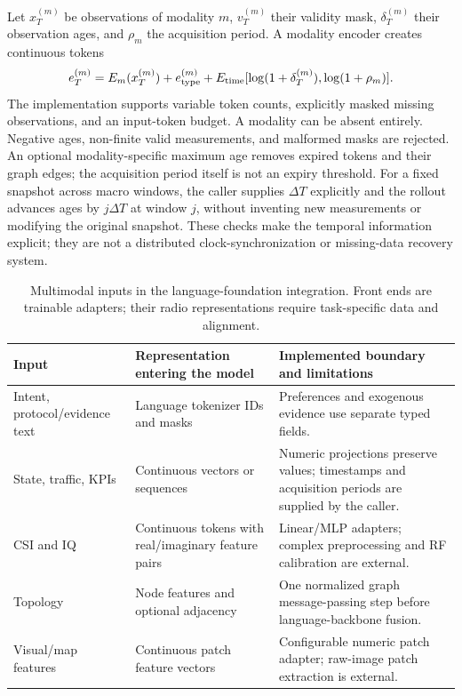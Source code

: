 Let $x_T^{(m)}$ be observations of modality $m$, $v_T^{(m)}$ their validity mask,
$\delta_T^{(m)}$ their observation ages, and $\rho_m$ the acquisition period.
A modality encoder creates continuous tokens
\begin{equation}
 e_T^{(m)}=E_m(x_T^{(m)})+e_{\rm type}^{(m)}
       +E_{\rm time}[\log(1+\delta_T^{(m)}),\log(1+\rho_m)].
\end{equation}
The implementation supports variable token counts, explicitly masked missing
observations, and an input-token budget. A modality can be absent entirely.
Negative ages, non-finite valid measurements, and malformed masks are rejected.
An optional modality-specific maximum age removes expired tokens and their graph
edges; the acquisition period itself is not an expiry threshold. For a fixed
snapshot across macro windows, the caller supplies $\Delta T$ explicitly and
the rollout advances ages by $j\Delta T$ at window $j$, without inventing new
measurements or modifying the original snapshot.
These checks make the temporal information explicit; they are not a distributed
clock-synchronization or missing-data recovery system.

\begin{table}[t]
\centering\small
\caption{Multimodal inputs in the language-foundation integration. Front ends are
trainable adapters; their radio representations require task-specific data and alignment.}
\begin{tabular}{p{}p{}p{}}
\toprule
Input & Representation entering the model & Implemented boundary and limitations\\
\midrule
Intent, protocol/evidence text & Language tokenizer IDs and masks & Preferences and exogenous evidence use separate typed fields.\\
State, traffic, KPIs & Continuous vectors or sequences & Numeric projections preserve values; timestamps and acquisition periods are supplied by the caller.\\
CSI and IQ & Continuous tokens with real/imaginary feature pairs & Linear/MLP adapters; complex preprocessing and RF calibration are external.\\
Topology & Node features and optional adjacency & One normalized graph message-passing step before language-backbone fusion.\\
Visual/map features & Continuous patch feature vectors & Configurable numeric patch adapter; raw-image patch extraction is external.\\
\bottomrule
\end{tabular}
\label{tab:modalities}
\end{table}

